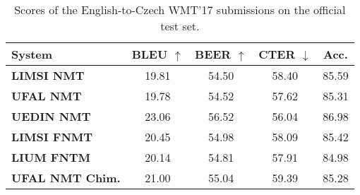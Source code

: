 \documentclass[11pt,letterpaper,final,nohyperref]{article}
\begin{document}
\begin{table}[tb] %
\begin{center}
\scriptsize %
\begin{tabular}{ l|cccc } 
\hline
System & BLEU $\uparrow$ & BEER $\uparrow$ & CTER $\downarrow$ & Acc. \\
\hline
\textbf{LIMSI NMT}      & 19.81 & 54.50 & 58.40 & 85.59 \\
\textbf{UFAL NMT}       & 19.78 & 54.52 & 57.62 & 85.31 \\
\textbf{UEDIN NMT}      & 23.06 & 56.52 & 56.04 & 86.98 \\
\textbf{LIMSI FNMT}     & 20.45 & 54.98 & 58.09 & 85.42 \\
\textbf{LIUM FNTM}      & 20.14 & 54.81 & 57.91 & 84.98 \\
\textbf{UFAL NMT Chim.} & 21.00 & 55.04 & 59.39 & 85.28 \\
\hline
 \end{tabular} 
\caption{\label{tab:bleuCs} Scores of the English-to-Czech WMT'17 submissions on the official test set.}
\end{center}
\end{table}
\end{document}
